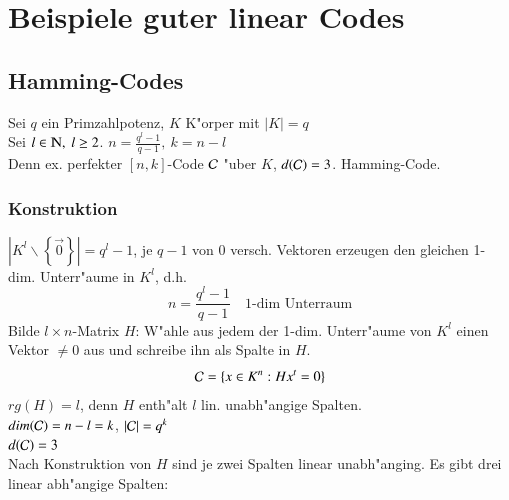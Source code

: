 \section{Beispiele guter linear Codes}
\subsection{Hamming-Codes}
Sei $q$ ein Primzahlpotenz, $K$ K"orper mit $\left| K \right| = q$\\
Sei $l \in  \N,\ l \geq 2$. $n=\frac{q^l-1}{q-1},\ k=n-l$  \\
Denn ex. perfekter $[n,k]$-Code $\mathcal{C}$ "uber $K$, $d(\mathcal{C})=3$.
Hamming-Code.
\subsubsection{Konstruktion}
$\left| K^l \backslash \left\lbrace \vec{0} \right\rbrace \right| = q^l -1$, je $q-1$ von $0$ versch. Vektoren erzeugen den gleichen 1-dim. Unterr"aume in $K^l$, d.h.
\[
	n = \frac{q^l-1}{q-1} \quad \text{1-dim Unterraum}
\]
Bilde $l\times n$-Matrix $H$: W"ahle aus jedem der 1-dim. Unterr"aume von $K^l$ einen Vektor $\neq 0$ aus und schreibe ihn als Spalte in $H$.\\
\[
	\mathcal{C} = \lbrace x \in K^n : Hx^t=0 \rbrace
\]
$rg(H)=l$, denn $H$ enth"alt $l$ lin. unabh"angige Spalten.\\
$dim(\mathcal{C})=n-l=k$, $\left| \mathcal{C} \right| = q^k$ \\
$d(\mathcal{C})=3$\\
Nach Konstruktion von $H$ sind je zwei Spalten linear unabh"anging. Es gibt drei linear abh"angige Spalten:
